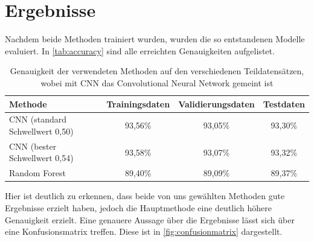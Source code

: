 \section{Ergebnisse}
\label{sec:Ergebnisse}

Nachdem beide Methoden trainiert wurden, wurden die so entstandenen Modelle evaluiert.
In \autoref{tab:accuracy} sind alle erreichten Genauigkeiten aufgelistet.

\begin{table}
    \centering
    \caption{Genauigkeit der verwendeten Methoden auf den verschiedenen Teildatensätzen, wobei mit CNN das Convolutional Neural Network gemeint ist}
    \label{tab:accuracy}
    \begin{tabular}{l c c c}
        \toprule 
        Methode & Trainingsdaten & Validierungsdaten & Testdaten \\ 
        \midrule 
        CNN (standard Schwellwert 0,50) & 93,56\% & 93,05\% & 93,30\% \\
        CNN (bester Schwellwert 0,54) & 93,58\% & 93,07\% & 93,32\% \\
        Random Forest & 89,40\% & 89,09\% & 89,37\% \\
        \bottomrule
    \end{tabular}
\end{table}

Hier ist deutlich zu erkennen, dass beide von uns gewählten Methoden gute Ergebnisse erzielt haben, jedoch die Hauptmethode eine deutlich höhere Genauigkeit erzielt.
Eine genauere Aussage über die Ergebnisse lässt sich über eine Konfusionsmatrix treffen. Diese ist in \autoref{fig:confusionmatrix} dargestellt.

